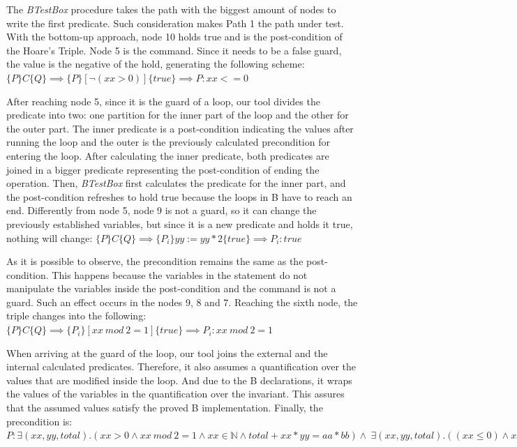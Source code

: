 \documentclass[runningheads]{llncs}
\begin{document}
The \textit{BTestBox} procedure takes the path with the biggest amount of nodes to write the first predicate. Such consideration makes Path 1 the path under test. With the bottom-up approach, node 10 holds true and is the post-condition of the Hoare's Triple. Node 5 is the command. Since it needs to be a false guard, the value is the negative of the hold, generating the following scheme:
$\{P\} C \{Q\} \implies \{P\} [\neg(xx > 0)] \{true\} \implies P: xx <= 0 $


After reaching node 5, since it is the guard of a loop, our tool divides the predicate into two: one partition for the inner part of the loop and the other for the outer part. The inner predicate is a post-condition indicating the values after running the loop and the outer is the previously calculated precondition for entering the loop. After calculating the inner predicate, both predicates are joined in a bigger predicate representing the post-condition of ending the operation. Then, \textit{BTestBox} first calculates the predicate for the inner part, and the post-condition refreshes to hold true because the loops in B have to reach an end. Differently from node 5, node 9 is not a guard, so it can change the previously established variables, but since it is a new predicate and holds it true, nothing will change:
$\{P\} C \{Q\} \implies \{P_i\} yy := yy * 2\{true\} \implies P_i: true$ 

As it is possible to observe, the precondition remains the same as the post-condition. This happens because the variables in the statement do not manipulate the variables inside the post-condition and the command is not a guard. Such an effect occurs in the nodes 9, 8 and 7. Reaching the sixth node, the triple changes into the following:
$\{P\} C \{Q\} \implies \{P_i\} [xx\ mod\ 2=1]\{true\} \implies P_i: xx\ mod\ 2 = 1$ 

When arriving at the guard of the loop, our tool joins the external and the internal calculated predicates. Therefore, it also assumes a quantification over the values that are modified inside the loop. And due to the B declarations, it wraps the values of the variables in the quantification over the invariant. This assures that the assumed values satisfy the proved B implementation. Finally, the precondition is:
$P: \exists(xx, yy, total).(xx > 0 \wedge xx\ mod\ 2 = 1 \wedge xx \in \mathbb{N} \wedge total + xx * yy = aa * bb) \wedge \ \exists(xx, yy, total).((xx \leq 0) \wedge xx \in \mathbb{N} \wedge total + xx * yy = aa * bb)$ 
\end{document}
